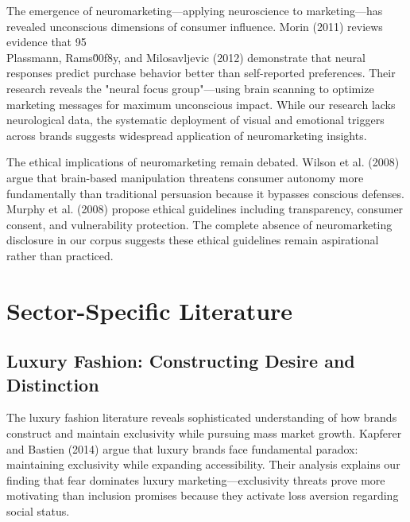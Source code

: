 The emergence of neuromarketing—applying neuroscience to marketing—has revealed unconscious dimensions of consumer influence. Morin (2011) reviews evidence that 95\\%

Plassmann, Rams\u00f8y, and Milosavljevic (2012) demonstrate that neural responses predict purchase behavior better than self-reported preferences. Their research reveals the "neural focus group"—using brain scanning to optimize marketing messages for maximum unconscious impact. While our research lacks neurological data, the systematic deployment of visual and emotional triggers across brands suggests widespread application of neuromarketing insights.

The ethical implications of neuromarketing remain debated. Wilson et al. (2008) argue that brain-based manipulation threatens consumer autonomy more fundamentally than traditional persuasion because it bypasses conscious defenses. Murphy et al. (2008) propose ethical guidelines including transparency, consumer consent, and vulnerability protection. The complete absence of neuromarketing disclosure in our corpus suggests these ethical guidelines remain aspirational rather than practiced.

\section{Sector-Specific Literature}
\label{sec:sector_lit}

\subsection{Luxury Fashion: Constructing Desire and Distinction}

The luxury fashion literature reveals sophisticated understanding of how brands construct and maintain exclusivity while pursuing mass market growth. Kapferer and Bastien (2014) argue that luxury brands face fundamental paradox: maintaining exclusivity while expanding accessibility. Their analysis explains our finding that fear dominates luxury marketing—exclusivity threats prove more motivating than inclusion promises because they activate loss aversion regarding social status.

